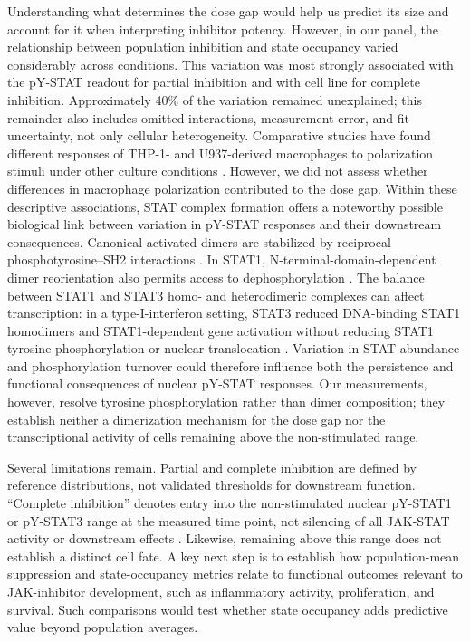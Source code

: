 \documentclass[11pt]{article}
\newcommand{\pstatone}{pY-STAT1}
\newcommand{\pstatthree}{pY-STAT3}
\begin{document}
Understanding what determines the dose gap would help us predict its size and account for it when interpreting inhibitor potency. However,  in our panel, the relationship between population inhibition and state occupancy varied considerably across conditions. This variation was most strongly associated with the pY-STAT readout for partial inhibition and with cell line for complete inhibition. Approximately 40\% of the variation remained unexplained; this remainder also includes omitted interactions, measurement error, and fit uncertainty, not only cellular heterogeneity. Comparative studies have found different responses of THP-1- and U937-derived macrophages to polarization stimuli under other culture conditions \citep{nascimento2022comparison}. However, we did not assess whether differences in macrophage polarization contributed to the dose gap. Within these descriptive associations, STAT complex formation offers a noteworthy possible biological link between variation in pY-STAT responses and their downstream consequences. Canonical activated dimers are stabilized by reciprocal phosphotyrosine--SH2 interactions \citep{chen1998stat1}. In STAT1, N-terminal-domain-dependent dimer reorientation also permits access to dephosphorylation \citep{mertens2006dephosphorylation}. The balance between STAT1 and STAT3 homo- and heterodimeric complexes can affect transcription: in a type-I-interferon setting, STAT3 reduced DNA-binding STAT1 homodimers and STAT1-dependent gene activation without reducing STAT1 tyrosine phosphorylation or nuclear translocation \citep{ho2006stat3}. Variation in STAT abundance and phosphorylation turnover could therefore influence both the persistence and functional consequences of nuclear pY-STAT responses. Our measurements, however, resolve tyrosine phosphorylation rather than dimer composition; they establish neither a dimerization mechanism for the dose gap nor the transcriptional activity of cells remaining above the non-stimulated range.

Several limitations remain. Partial and complete inhibition are defined by reference distributions, not validated thresholds for downstream function. ``Complete inhibition'' denotes entry into the non-stimulated nuclear \pstatone{} or \pstatthree{} range at the measured time point, not silencing of all JAK\nobreakdash-STAT activity or downstream effects \citep{housden2014spatial}. Likewise, remaining above this range does not establish a distinct cell fate.  A key next step is to establish how population-mean suppression and state-occupancy metrics relate to functional outcomes relevant to JAK-inhibitor development, such as inflammatory activity, proliferation, and survival. Such comparisons would test whether state occupancy adds predictive value beyond population averages.
\end{document}
